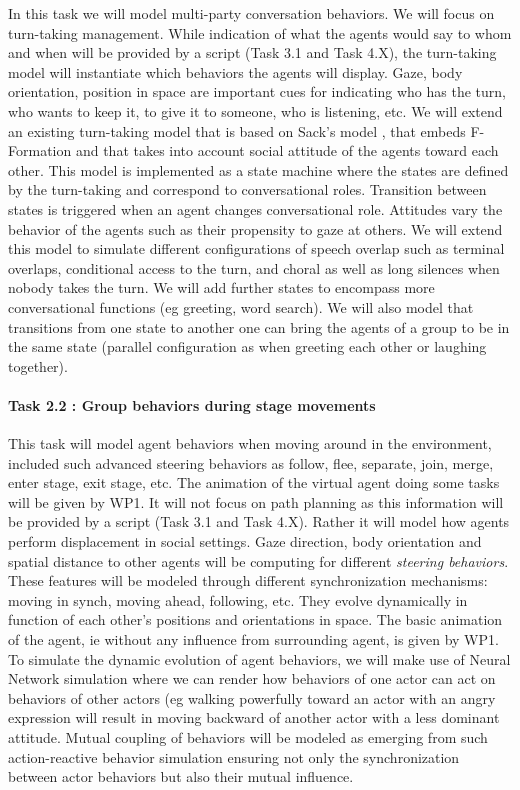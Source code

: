 In this task we will model multi-party conversation behaviors. We will focus on turn-taking management. While indication of what the agents would say to whom and when will be provided by a script (Task 3.1 and Task 4.X), the turn-taking model will instantiate which behaviors the agents will display. Gaze, body orientation, position in space are important cues for indicating who has the turn, who wants to keep it, to give it to someone, who is listening, etc.  We will extend an existing turn-taking model \cite{ RavenetCOP14} that is based on Sack's model \cite{SAC74}, that embeds F-Formation \cite{Kendon90}  and that takes into account social attitude of the agents toward each other. This model is implemented as a state machine where the states are defined by the turn-taking and correspond to conversational roles. Transition between states is triggered when an agent changes conversational role. Attitudes vary the behavior of the agents such as their propensity to gaze at others. We will extend this model to 
simulate different configurations of speech overlap such as terminal overlaps, conditional access to the turn, and choral \cite{Schegloff2000} as well as long silences when nobody takes the turn. We will add further states to encompass more conversational functions (eg greeting, word search). We will also model that transitions from one state to another one can bring the agents of a group to be in the same state (parallel configuration as when greeting each other or laughing together).


\paragraph{Task 2.2 : Group behaviors during stage movements}

This task will model agent behaviors when moving around in the environment,  included such  advanced  steering behaviors as follow, flee, separate, join, merge, enter stage, exit stage, etc. The animation of the virtual agent doing some tasks will be given by WP1. It will not focus on path planning as this information will be provided by a script (Task 3.1 and Task 4.X). Rather it will model how agents perform displacement in social settings. Gaze direction, body orientation and spatial distance to other agents will be computing for different {\em steering behaviors}. These features will be modeled through different synchronization mechanisms: moving in synch, moving ahead, following, etc. They evolve dynamically in function of each other's  positions and orientations in space. The basic animation of the agent, ie without any influence from surrounding agent, is given by WP1. To simulate the dynamic evolution of agent behaviors,  we will make use of Neural Network simulation \cite{Prepin2013} where we can 
render how behaviors of one actor can act on behaviors of other actors (eg walking powerfully toward an actor with an angry expression will result in moving backward of another actor with a less dominant attitude. Mutual coupling of behaviors will be modeled as emerging from such action-reactive behavior simulation \cite{Prepin2013} ensuring not only the synchronization between actor behaviors but also their mutual influence. 


